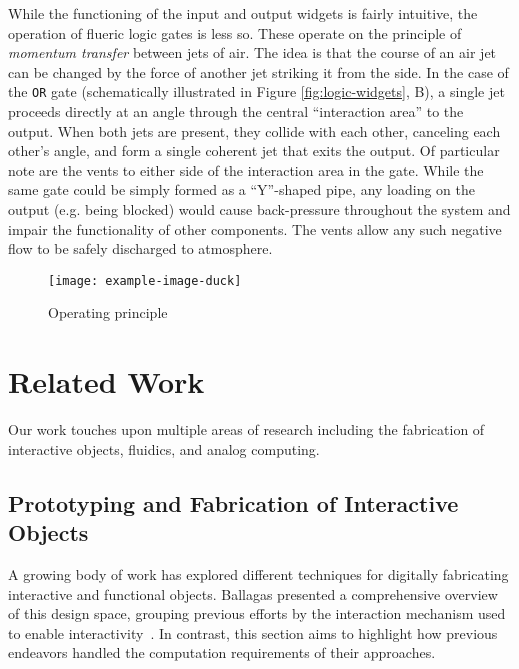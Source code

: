    While the functioning of the input and output widgets is fairly
    intuitive, the operation of flueric logic gates is less so.
    These operate on the principle of \textit{momentum transfer}
    between jets of air. The idea is that the course of an air jet
    can be changed by the force of another jet striking it from the
    side. In the case of the \texttt{OR} gate (schematically
    illustrated in Figure \ref{fig:logic-widgets}, B), a single jet proceeds
    directly at an angle through the central ``interaction area'' to the
    output. When both jets are present, they collide with each other,
    canceling each other's angle, and form a single coherent jet that exits
    the output. Of particular note are the vents to either side of the
    interaction area in the gate. While the same gate could be simply
    formed as a ``Y''-shaped pipe, any loading on the output (e.g. being
    blocked) would cause back-pressure throughout the system and impair the
    functionality of other components. The vents allow any such negative
    flow to be safely discharged to atmosphere.

    \begin{figure}
      \centering
      \texttt{[image: example-image-duck]}
      \caption{Operating principle}
      \label{fig:app-slider}
    \end{figure}

  \section{Related Work}
    Our work touches upon multiple areas of research including the
    fabrication of interactive objects, fluidics, and analog computing.

      \subsection{Prototyping and Fabrication of Interactive Objects}
        A growing body of work has explored different techniques for
        digitally fabricating interactive and functional objects. Ballagas
        \etal presented a comprehensive overview of this design space,
        grouping previous efforts by the interaction mechanism used to
        enable interactivity~\cite{Ballagas:2018}. In contrast, this
        section aims to highlight how previous endeavors handled the
        computation requirements of their approaches.

